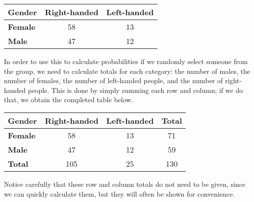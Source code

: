 \begin{center}
\begin{tabular}{l | c c}
\textbf{Gender} & \textbf{Right-handed} & \textbf{Left-handed} \\ \hline 
\textbf{Female} & 58 & 13\\ 
\textbf{Male} & 47 & 12  \\ 
\end{tabular}
\end{center}

In order to use this to calculate probabilities if we randomly select someone from the group, we need to calculate totals for each category: the number of males, the number of females, the number of left-handed people, and the number of right-handed people.  This is done by simply summing each row and column; if we do that, we obtain the completed table below.

\begin{center}
\begin{tabular}{l | c c | c}
\textbf{Gender} & \textbf{Right-handed} & \textbf{Left-handed} & \textbf{Total} \\ \hline 
\textbf{Female} & 58 & 13 & 71\\ 
\textbf{Male} & 47 & 12 & 59  \\ \hline
\textbf{Total} & 105 & 25 & 130 \\  
\end{tabular}
\end{center}

Notice carefully that these row and column totals do not need to be given, since we can quickly calculate them, but they will often be shown for convenience.

